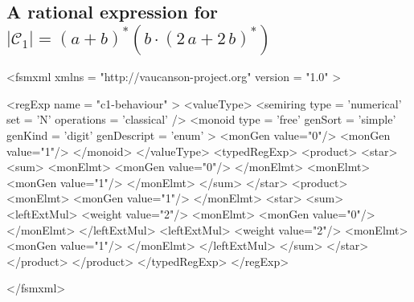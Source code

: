 \newpage

\subsection{A rational expression for 
$|\mathcal{C}_{1}| = (a+b)^{*}(b\cdot(2\,a + 2\,b)^{*})$}
\label{regExpC1}

{\footnotesize 
\begin{listing}[5]{1} 
<fsmxml  xmlns   = "http://vaucanson-project.org" 
         version = "1.0" > 

<regExp name = "c1-behaviour" >
  <valueType>
    <semiring  type        = 'numerical'
               set         = 'N'
               operations  = 'classical' /> 
    <monoid    type        = 'free'
               genSort     = 'simple' 
               genKind     = 'digit' 
               genDescript = 'enum' > 
      <monGen value="0"/>
      <monGen value="1"/>
    </monoid>
  </valueType>
  <typedRegExp>
    <product>
      <star>
        <sum>
          <monElmt>
            <monGen value="0"/>
          </monElmt>
          <monElmt>
            <monGen value="1"/>
          </monElmt>
        </sum>
      </star>
      <product>
        <monElmt>
          <monGen value="1"/>
        </monElmt>
        <star>
          <sum>
	    <leftExtMul>
              <weight value="2"/>
	      <monElmt>
		<monGen value="0"/>
	      </monElmt>
	    </leftExtMul>
	    <leftExtMul>
              <weight value="2"/>
	      <monElmt>
		<monGen value="1"/>
	      </monElmt>
	    </leftExtMul>
          </sum>
        </star>
      </product>
    </product>
  </typedRegExp>
</regExp>

</fsmxml>
\end{listing}
}

\clearpage

~
\clearpage
\newpage
